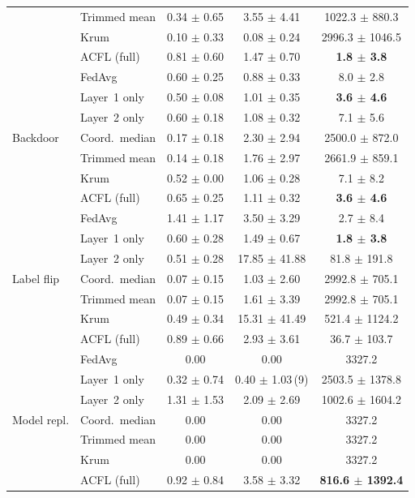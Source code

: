 \begin{table}[t]
{\begin{tabular}{llccc}
 & Trimmed mean & 0.34 $\pm$ 0.65 & 3.55 $\pm$ 4.41 & 1022.3 $\pm$ 880.3 \\
 & Krum & 0.10 $\pm$ 0.33 & 0.08 $\pm$ 0.24 & 2996.3 $\pm$ 1046.5 \\
 & ACFL (full) & 0.81 $\pm$ 0.60 & 1.47 $\pm$ 0.70 & \textbf{1.8 $\pm$ 3.8} \\
\midrule
\multirow{7}{*}{Backdoor} & FedAvg & 0.60 $\pm$ 0.25 & 0.88 $\pm$ 0.33 & 8.0 $\pm$ 2.8 \\
 & Layer~1 only & 0.50 $\pm$ 0.08 & 1.01 $\pm$ 0.35 & \textbf{3.6 $\pm$ 4.6} \\
 & Layer~2 only & 0.60 $\pm$ 0.18 & 1.08 $\pm$ 0.32 & 7.1 $\pm$ 5.6 \\
 & Coord.\ median & 0.17 $\pm$ 0.18 & 2.30 $\pm$ 2.94 & 2500.0 $\pm$ 872.0 \\
 & Trimmed mean & 0.14 $\pm$ 0.18 & 1.76 $\pm$ 2.97 & 2661.9 $\pm$ 859.1 \\
 & Krum & 0.52 $\pm$ 0.00 & 1.06 $\pm$ 0.28 & 7.1 $\pm$ 8.2 \\
 & ACFL (full) & 0.65 $\pm$ 0.25 & 1.11 $\pm$ 0.32 & \textbf{3.6 $\pm$ 4.6} \\
\midrule
\multirow{7}{*}{Label flip} & FedAvg & 1.41 $\pm$ 1.17 & 3.50 $\pm$ 3.29 & 2.7 $\pm$ 8.4 \\
 & Layer~1 only & 0.60 $\pm$ 0.28 & 1.49 $\pm$ 0.67 & \textbf{1.8 $\pm$ 3.8} \\
 & Layer~2 only & 0.51 $\pm$ 0.28 & 17.85 $\pm$ 41.88 & 81.8 $\pm$ 191.8 \\
 & Coord.\ median & 0.07 $\pm$ 0.15 & 1.03 $\pm$ 2.60 & 2992.8 $\pm$ 705.1 \\
 & Trimmed mean & 0.07 $\pm$ 0.15 & 1.61 $\pm$ 3.39 & 2992.8 $\pm$ 705.1 \\
 & Krum & 0.49 $\pm$ 0.34 & 15.31 $\pm$ 41.49 & 521.4 $\pm$ 1124.2 \\
 & ACFL (full) & 0.89 $\pm$ 0.66 & 2.93 $\pm$ 3.61 & 36.7 $\pm$ 103.7 \\
\midrule
\multirow{7}{*}{Model repl.} & FedAvg & 0.00 & 0.00 & 3327.2 \\
 & Layer~1 only & 0.32 $\pm$ 0.74 & 0.40 $\pm$ 1.03\,{\scriptsize(9)} & 2503.5 $\pm$ 1378.8 \\
 & Layer~2 only & 1.31 $\pm$ 1.53 & 2.09 $\pm$ 2.69 & 1002.6 $\pm$ 1604.2 \\
 & Coord.\ median & 0.00 & 0.00 & 3327.2 \\
 & Trimmed mean & 0.00 & 0.00 & 3327.2 \\
 & Krum & 0.00 & 0.00 & 3327.2 \\
 & ACFL (full) & 0.92 $\pm$ 0.84 & 3.58 $\pm$ 3.32 & \textbf{816.6 $\pm$ 1392.4} \\
\bottomrule
\end{tabular}}
\end{table}
